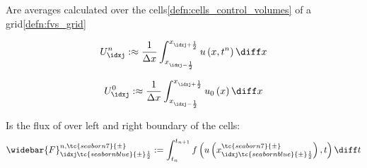 \begin{defnbox}\nospacing
    \begin{defn}\label{defn:cell_averages}
      Are averages calculated over the cells\cref{defn:cells_control_volumes} of a grid\cref{defn:fvs_grid}\leavevmode\\
      \begin{minipage}{0.45\textwidth}
      \begin{align}
        U_{\idxj}^{n}:\approx\frac{1}{\Delta x}\int_{x_{\idxj-\frac{1}{2}}}^{x_{\idxj+\frac{1}{2}}}u\left(x,t^{n}\right)\diff x
      \end{align}
      \end{minipage}\hfill
      \begin{minipage}[c]{0.45\textwidth}
          \begin{figure}[H]
              \centering{
                \def\svgwidth{100pt}
                \resizebox{\linewidth}{!}{}
              }
          \end{figure}
      \end{minipage}
    \end{defn}
\end{defnbox}
\begin{corbox}\nospacing
    \begin{cor}\label{cor:initial_cell_averages}
      \begin{align}
        U_{\idxj}^{0}:\approx\frac{1}{\Delta x}\int_{x_{\idxj-\frac{1}{2}}}^{x_{\idxj+\frac{1}{2}}}u_{0}\left(x\right)\diff x
      \end{align}
    \end{cor}
\end{corbox}
\begin{defnbox}\nospacing
    \begin{defn}\label{defn:integrated_fluxes}
        Is the flux of over left and right boundary of the cells:
        \begin{align}
          \widebar{F}_{\idxj\tc{seabornblue}{\pm}\frac{1}{2}}^{n,\tc{seaborn7}{\pm}}:=\int_{t_{n}}^{t_{n+1}}f \left(u\left(x_{\idxj\tc{seabornblue}{\pm}\frac{1}{2}}^{\tc{seaborn7}{\pm}}\right),t\right)\diff t\label{eq:integrated_fluxes}
        \end{align}
        \begin{figure}[H]
            \centering{
              \def\svgwidth{200pt}
              \resizebox{0.9\linewidth}{!}{}
            }
        \end{figure}
    \end{defn}
\end{defnbox}
